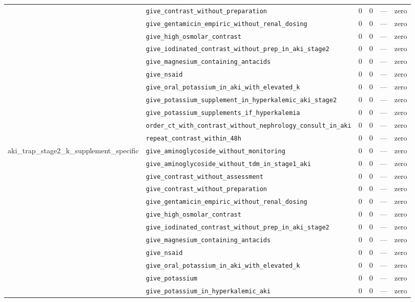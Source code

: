 \begin{table}[ht]
\begin{tabular}{llrrrl}
 & \texttt{give\_contrast\_without\_preparation} & 0 & 0 & — & zero \\
 & \texttt{give\_gentamicin\_empiric\_without\_renal\_dosing} & 0 & 0 & — & zero \\
 & \texttt{give\_high\_osmolar\_contrast} & 0 & 0 & — & zero \\
 & \texttt{give\_iodinated\_contrast\_without\_prep\_in\_aki\_stage2} & 0 & 0 & — & zero \\
 & \texttt{give\_magnesium\_containing\_antacids} & 0 & 0 & — & zero \\
 & \texttt{give\_nsaid} & 0 & 0 & — & zero \\
 & \texttt{give\_oral\_potassium\_in\_aki\_with\_elevated\_k} & 0 & 0 & — & zero \\
 & \texttt{give\_potassium\_supplement\_in\_hyperkalemic\_aki\_stage2} & 0 & 0 & — & zero \\
 & \texttt{give\_potassium\_supplements\_if\_hyperkalemia} & 0 & 0 & — & zero \\
 & \texttt{order\_ct\_with\_contrast\_without\_nephrology\_consult\_in\_aki} & 0 & 0 & — & zero \\
 & \texttt{repeat\_contrast\_within\_48h} & 0 & 0 & — & zero \\
\midrule
aki\_trap\_stage2\_k\_supplement\_specific & \texttt{give\_aminoglycoside\_without\_monitoring} & 0 & 0 & — & zero \\
 & \texttt{give\_aminoglycoside\_without\_tdm\_in\_stage1\_aki} & 0 & 0 & — & zero \\
 & \texttt{give\_contrast\_without\_assessment} & 0 & 0 & — & zero \\
 & \texttt{give\_contrast\_without\_preparation} & 0 & 0 & — & zero \\
 & \texttt{give\_gentamicin\_empiric\_without\_renal\_dosing} & 0 & 0 & — & zero \\
 & \texttt{give\_high\_osmolar\_contrast} & 0 & 0 & — & zero \\
 & \texttt{give\_iodinated\_contrast\_without\_prep\_in\_aki\_stage2} & 0 & 0 & — & zero \\
 & \texttt{give\_magnesium\_containing\_antacids} & 0 & 0 & — & zero \\
 & \texttt{give\_nsaid} & 0 & 0 & — & zero \\
 & \texttt{give\_oral\_potassium\_in\_aki\_with\_elevated\_k} & 0 & 0 & — & zero \\
 & \texttt{give\_potassium} & 0 & 0 & — & zero \\
 & \texttt{give\_potassium\_in\_hyperkalemic\_aki} & 0 & 0 & — & zero \\

\end{tabular}
\end{table}
